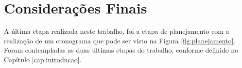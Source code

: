 \chapter{Considerações Finais} \label{cap:consideracoes_finais}

% 
% 

A última etapa realizada neste trabalho, foi a etapa de planejamento com a realização de um cronograma que pode ser visto na Figura \ref{fig:planejamento}.
Foram contempladas as duas últimas etapas do trabalho, conforme definido no Capítulo \ref{cap:introducao}.


